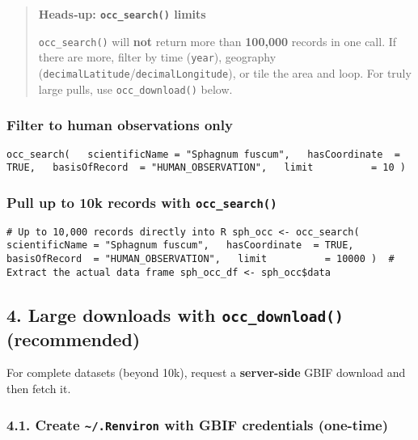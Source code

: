 \documentclass[
  letterpaper,
  DIV=11,
  numbers=noendperiod]{scrartcl}
\begin{document}
\begin{tcolorbox}
\begin{quote}
\textbf{Heads‑up: \texttt{occ\_search()} limits}

\texttt{occ\_search()} will \textbf{not} return more than
\textbf{100,000} records in one call. If there are more, filter by time
(\texttt{year}), geography
(\texttt{decimalLatitude}/\texttt{decimalLongitude}), or tile the area
and loop. For truly large pulls, use \texttt{occ\_download()} below.\\
\end{quote}

\subsubsection{Filter to human observations
only}\label{filter-to-human-observations-only}

\begin{verbatim}
occ_search(   scientificName = "Sphagnum fuscum",   hasCoordinate  = TRUE,   basisOfRecord  = "HUMAN_OBSERVATION",   limit          = 10 ) 
\end{verbatim}

\subsubsection{\texorpdfstring{Pull up to 10k records with
\texttt{occ\_search()}}{Pull up to 10k records with occ\_search()}}\label{pull-up-to-10k-records-with-occ_search}

\begin{verbatim}
# Up to 10,000 records directly into R sph_occ <- occ_search(   scientificName = "Sphagnum fuscum",   hasCoordinate  = TRUE,   basisOfRecord  = "HUMAN_OBSERVATION",   limit          = 10000 )  # Extract the actual data frame sph_occ_df <- sph_occ$data 
\end{verbatim}

\subsection{\texorpdfstring{4. Large downloads with
\texttt{occ\_download()}
(recommended)}{4. Large downloads with occ\_download() (recommended)}}\label{large-downloads-with-occ_download-recommended}

For complete datasets (beyond 10k), request a \textbf{server-side} GBIF
download and then fetch it.

\subsubsection{\texorpdfstring{4.1. Create
\texttt{\textasciitilde{}/.Renviron} with GBIF credentials
(one-time)}{4.1. Create \textasciitilde/.Renviron with GBIF credentials (one-time)}}\label{create-.renviron-with-gbif-credentials-one-time}


\end{tcolorbox}
\end{document}
